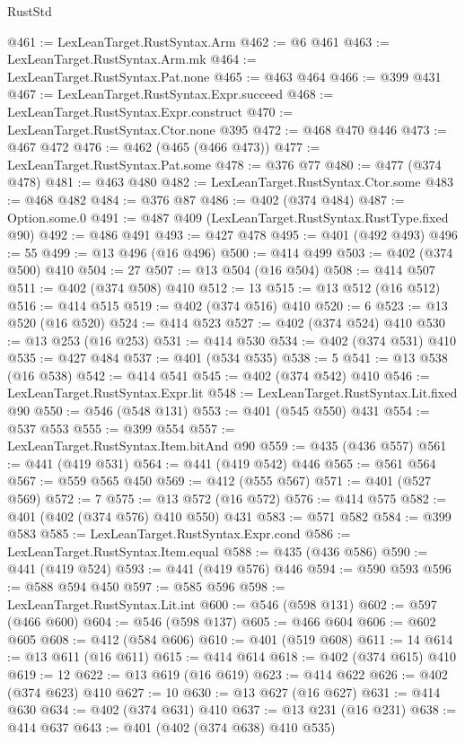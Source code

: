 \begin{lexlean}{RustStd}
\begin{coremodule}
@461 := LexLeanTarget.RustSyntax.Arm
@462 := @6 @461
@463 := LexLeanTarget.RustSyntax.Arm.mk
@464 := LexLeanTarget.RustSyntax.Pat.none
@465 := @463 @464
@466 := @399 @431
@467 := LexLeanTarget.RustSyntax.Expr.succeed
@468 := LexLeanTarget.RustSyntax.Expr.construct
@470 := LexLeanTarget.RustSyntax.Ctor.none @395
@472 := @468 @470 @446
@473 := @467 @472
@476 := @462 (@465 (@466 @473))
@477 := LexLeanTarget.RustSyntax.Pat.some
@478 := @376 @77
@480 := @477 (@374 @478)
@481 := @463 @480
@482 := LexLeanTarget.RustSyntax.Ctor.some
@483 := @468 @482
@484 := @376 @87
@486 := @402 (@374 @484)
@487 := Option.some.{0}
@491 := @487 @409 (LexLeanTarget.RustSyntax.RustType.fixed @90)
@492 := @486 @491
@493 := @427 @478
@495 := @401 (@492 @493)
@496 := 55
@499 := @13 @496 (@16 @496)
@500 := @414 @499
@503 := @402 (@374 @500) @410
@504 := 27
@507 := @13 @504 (@16 @504)
@508 := @414 @507
@511 := @402 (@374 @508) @410
@512 := 13
@515 := @13 @512 (@16 @512)
@516 := @414 @515
@519 := @402 (@374 @516) @410
@520 := 6
@523 := @13 @520 (@16 @520)
@524 := @414 @523
@527 := @402 (@374 @524) @410
@530 := @13 @253 (@16 @253)
@531 := @414 @530
@534 := @402 (@374 @531) @410
@535 := @427 @484
@537 := @401 (@534 @535)
@538 := 5
@541 := @13 @538 (@16 @538)
@542 := @414 @541
@545 := @402 (@374 @542) @410
@546 := LexLeanTarget.RustSyntax.Expr.lit
@548 := LexLeanTarget.RustSyntax.Lit.fixed @90
@550 := @546 (@548 @131)
@553 := @401 (@545 @550) @431
@554 := @537 @553
@555 := @399 @554
@557 := LexLeanTarget.RustSyntax.Item.bitAnd @90
@559 := @435 (@436 @557)
@561 := @441 (@419 @531)
@564 := @441 (@419 @542) @446
@565 := @561 @564
@567 := @559 @565 @450
@569 := @412 (@555 @567)
@571 := @401 (@527 @569)
@572 := 7
@575 := @13 @572 (@16 @572)
@576 := @414 @575
@582 := @401 (@402 (@374 @576) @410 @550) @431
@583 := @571 @582
@584 := @399 @583
@585 := LexLeanTarget.RustSyntax.Expr.cond
@586 := LexLeanTarget.RustSyntax.Item.equal
@588 := @435 (@436 @586)
@590 := @441 (@419 @524)
@593 := @441 (@419 @576) @446
@594 := @590 @593
@596 := @588 @594 @450
@597 := @585 @596
@598 := LexLeanTarget.RustSyntax.Lit.int
@600 := @546 (@598 @131)
@602 := @597 (@466 @600)
@604 := @546 (@598 @137)
@605 := @466 @604
@606 := @602 @605
@608 := @412 (@584 @606)
@610 := @401 (@519 @608)
@611 := 14
@614 := @13 @611 (@16 @611)
@615 := @414 @614
@618 := @402 (@374 @615) @410
@619 := 12
@622 := @13 @619 (@16 @619)
@623 := @414 @622
@626 := @402 (@374 @623) @410
@627 := 10
@630 := @13 @627 (@16 @627)
@631 := @414 @630
@634 := @402 (@374 @631) @410
@637 := @13 @231 (@16 @231)
@638 := @414 @637
@643 := @401 (@402 (@374 @638) @410 @535)

\end{coremodule}
\end{lexlean}
